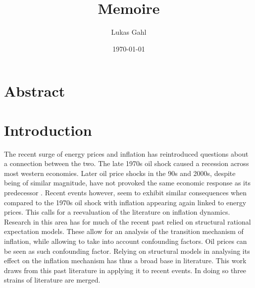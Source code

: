 \documentclass[12pt,a4paper,english]{article} %
\author{Lukas Gahl}
\title{\textbf{\huge Memoire }\\}
\date{\today}
\let\oldsection\section
\renewcommand\section{\clearpage\oldsection}
\begin{document}
	
	
	\maketitle
	\pagebreak

	\section*{Abstract}
	\pagebreak

	
	\tableofcontents
	\pagebreak
	
	
	 \section{Introduction}
	 
	 The recent surge of energy prices and inflation has reintroduced questions about a connection between the two. The late 1970s oil shock caused a recession across most western economies. Later oil price shocks in the 90s and 2000s, despite being of similar magnitude, have not provoked the same economic response as its predecessor \cite{blanchard_macroeconomic_2007}. Recent events however, seem to exhibit similar consequences when compared to the 1970s oil shock with inflation appearing again linked to energy prices. This calls for a reevaluation of the literature on inflation dynamics. Research in this area has for much of the recent past relied on structural rational expectation models. These allow for an analysis of the transition mechanism of inflation, while allowing to take into account confounding factors. Oil prices can be seen as such confounding factor. Relying on structural models in analysing its effect on the inflation mechanism has thus a broad base in literature. This work draws from this past literature in applying it to recent events. In doing so three strains of literature are merged.
	 
\end{document}
